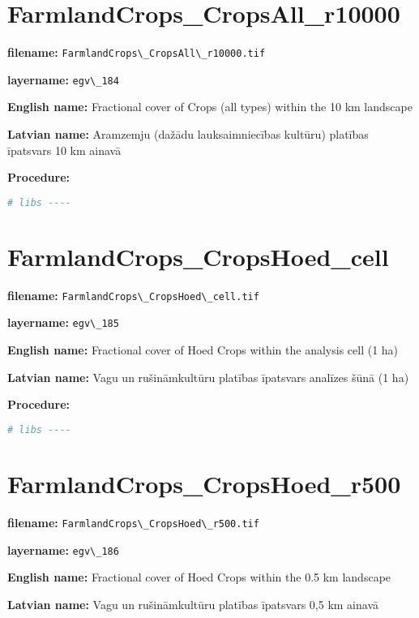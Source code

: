\documentclass[
]{book}
\newcommand{\passthrough}[1]{#1}
\begin{document}
\section{FarmlandCrops\_CropsAll\_r10000}\label{ch06.184}

\textbf{filename:} \passthrough{\lstinline!FarmlandCrops\_CropsAll\_r10000.tif!}

\textbf{layername:} \passthrough{\lstinline!egv\_184!}

\textbf{English name:} Fractional cover of Crops (all types) within the 10 km landscape

\textbf{Latvian name:} Aramzemju (dažādu lauksaimniecības kultūru) platības īpatsvars 10 km ainavā

\textbf{Procedure:}

\begin{lstlisting}[language=R]
# libs ----
\end{lstlisting}

\section{FarmlandCrops\_CropsHoed\_cell}\label{ch06.185}

\textbf{filename:} \passthrough{\lstinline!FarmlandCrops\_CropsHoed\_cell.tif!}

\textbf{layername:} \passthrough{\lstinline!egv\_185!}

\textbf{English name:} Fractional cover of Hoed Crops within the analysis cell (1 ha)

\textbf{Latvian name:} Vagu un rušināmkultūru platības īpatsvars analīzes šūnā (1 ha)

\textbf{Procedure:}

\begin{lstlisting}[language=R]
# libs ----
\end{lstlisting}

\section{FarmlandCrops\_CropsHoed\_r500}\label{ch06.186}

\textbf{filename:} \passthrough{\lstinline!FarmlandCrops\_CropsHoed\_r500.tif!}

\textbf{layername:} \passthrough{\lstinline!egv\_186!}

\textbf{English name:} Fractional cover of Hoed Crops within the 0.5 km landscape

\textbf{Latvian name:} Vagu un rušināmkultūru platības īpatsvars 0,5 km ainavā
\end{document}
